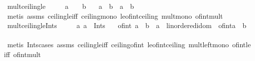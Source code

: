 \begin{isabellebody}
\endisatagproof
{\isafoldproof}%
%
\isadelimproof
\isanewline
%
\endisadelimproof
\isanewline
{}\isamarkupfalse%
\ mult{\isacharunderscore}{\kern0pt}ceiling{\isacharunderscore}{\kern0pt}le{\isacharcolon}{\kern0pt}\isanewline
\ \ \ {\isachardoublequoteopen}{}\ {\isasymle}\ a{\isachardoublequoteclose}\ \ {\isachardoublequoteopen}{}\ {\isasymle}\ b{\isachardoublequoteclose}\isanewline
\ \ \ {\isachardoublequoteopen}{\isasymlceil}a\ {\isacharasterisk}{\kern0pt}\ b{\isasymrceil}\ {\isasymle}\ {\isasymlceil}a{\isasymrceil}\ {\isacharasterisk}{\kern0pt}\ {\isasymlceil}b{\isasymrceil}{\isachardoublequoteclose}\isanewline
%
\isadelimproof
\ \ %
\endisadelimproof
%
\isatagproof
{}\isamarkupfalse%
\ {\isacharparenleft}{\kern0pt}metis\ assms\ ceiling{\isacharunderscore}{\kern0pt}le{\isacharunderscore}{\kern0pt}iff\ ceiling{\isacharunderscore}{\kern0pt}mono\ le{\isacharunderscore}{\kern0pt}of{\isacharunderscore}{\kern0pt}int{\isacharunderscore}{\kern0pt}ceiling\ mult{\isacharunderscore}{\kern0pt}mono\ of{\isacharunderscore}{\kern0pt}int{\isacharunderscore}{\kern0pt}mult{\isacharparenright}{\kern0pt}%
\endisatagproof
{\isafoldproof}%
%
\isadelimproof
\isanewline
%
\endisadelimproof
\isanewline
{}\isamarkupfalse%
\ mult{\isacharunderscore}{\kern0pt}ceiling{\isacharunderscore}{\kern0pt}le{\isacharunderscore}{\kern0pt}Ints{\isacharcolon}{\kern0pt}\isanewline
\ \ \ {\isachardoublequoteopen}{}\ {\isasymle}\ a{\isachardoublequoteclose}\ {\isachardoublequoteopen}a\ {\isasymin}\ Ints{\isachardoublequoteclose}\isanewline
\ \ \ {\isachardoublequoteopen}{\isacharparenleft}{\kern0pt}of{\isacharunderscore}{\kern0pt}int\ {\isasymlceil}a\ {\isacharasterisk}{\kern0pt}\ b{\isasymrceil}\ {\isacharcolon}{\kern0pt}{\isacharcolon}{\kern0pt}\ {\isacharprime}{\kern0pt}a\ {\isacharcolon}{\kern0pt}{\isacharcolon}{\kern0pt}\ linordered{\isacharunderscore}{\kern0pt}idom{\isacharparenright}{\kern0pt}\ {\isasymle}\ of{\isacharunderscore}{\kern0pt}int{\isacharparenleft}{\kern0pt}{\isasymlceil}a{\isasymrceil}\ {\isacharasterisk}{\kern0pt}\ {\isasymlceil}b{\isasymrceil}{\isacharparenright}{\kern0pt}{\isachardoublequoteclose}\isanewline
%
\isadelimproof
\ \ %
\endisadelimproof
%
\isatagproof
{}\isamarkupfalse%
\ {\isacharparenleft}{\kern0pt}metis\ Ints{\isacharunderscore}{\kern0pt}cases\ assms\ ceiling{\isacharunderscore}{\kern0pt}le{\isacharunderscore}{\kern0pt}iff\ ceiling{\isacharunderscore}{\kern0pt}of{\isacharunderscore}{\kern0pt}int\ le{\isacharunderscore}{\kern0pt}of{\isacharunderscore}{\kern0pt}int{\isacharunderscore}{\kern0pt}ceiling\ mult{\isacharunderscore}{\kern0pt}left{\isacharunderscore}{\kern0pt}mono\ of{\isacharunderscore}{\kern0pt}int{\isacharunderscore}{\kern0pt}le{\isacharunderscore}{\kern0pt}iff\ of{\isacharunderscore}{\kern0pt}int{\isacharunderscore}{\kern0pt}mult{\isacharparenright}{\kern0pt}%

\end{isabellebody}
